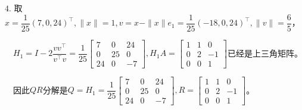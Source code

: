 \documentclass[cn,hazy,green,11pt,normal]{elegantnote}
\begin{document}
    $4.\,\,$取$x=\dfrac1{25}(7,0,24)^{\top},\|x\|=1,v=x-\|x\|e_1=\dfrac1{25}(-18,0,24)^{\top},\|v\|=\dfrac65$，

    $\quad H_1=I-2\dfrac{vv^{\top}}{v^{\top}v}=\dfrac1{25}\begin{bmatrix}7&0&24\\0&25&0\\24&0&-7\end{bmatrix},H_1 A=\begin{bmatrix}1&1&0\\0&2&-1\\0&0&1\end{bmatrix}$已经是上三角矩阵。

    $\quad$因此$QR$分解是$Q=H_1=\dfrac1{25}\begin{bmatrix}7&0&24\\0&25&0\\24&0&-7\end{bmatrix},R=\begin{bmatrix}1&1&0\\0&2&-1\\0&0&1\end{bmatrix}$。
\end{document}
